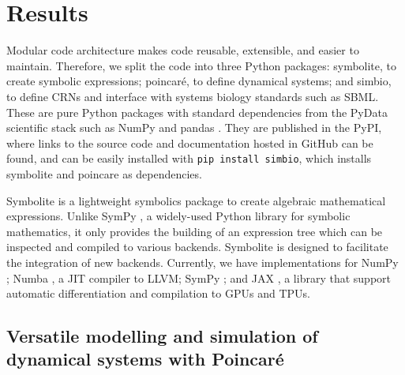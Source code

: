\documentclass[namedate,numsec,webpdf,modern,large]{oup-authoring-template}
\theoremstyle{thmstyleone}%
\theoremstyle{thmstyletwo}%
\theoremstyle{thmstylethree}%
\begin{document}
\section{Results}\label{results}

Modular code architecture makes code reusable, extensible, and easier to maintain.
Therefore, we split the code into three Python packages:
symbolite, to create symbolic expressions;
poincaré, to define dynamical systems;
and simbio, to define \acp{CRN} and interface with systems biology standards such as \ac{SBML}.
These are pure Python packages with standard dependencies from the PyData scientific stack
such as NumPy \citep{harrisArrayProgrammingNumPy2020} and pandas \citep{mckinneyDataStructuresStatistical2010}.
They are published in the \acf{PyPI},
where links to the source code and documentation hosted in GitHub can be found,
and can be easily installed with \texttt{pip\ install\ simbio},
which installs symbolite and poincare as dependencies.

Symbolite is a lightweight symbolics package to create algebraic mathematical expressions.
Unlike SymPy \citep{meurerSymPySymbolicComputing2017},
a widely-used Python library for symbolic mathematics,
it only provides the building of an expression tree
which can be inspected and compiled to various backends.
Symbolite is designed to facilitate the integration of new backends.
Currently, we have implementations for
NumPy \citep{harrisArrayProgrammingNumPy2020};
Numba \citep{lamNumbaLLVMbasedPython2015},
a \ac{JIT} compiler to LLVM;
SymPy \citep{meurerSymPySymbolicComputing2017};
and JAX \citep{jax2018github}, a
library that support automatic differentiation and compilation to \acp{GPU} and \acp{TPU}.

\subsection{Versatile modelling and simulation of dynamical systems with Poincaré}
\label{versatile-modelling-and-simulation-of-dynamical-systems-with-poincaruxe9}
\end{document}
